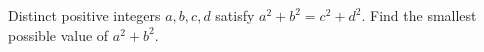 Distinct positive integers $a,b,c,d$ satisfy $a^2+b^2=c^2+d^2$. Find the smallest possible value of $a^2+b^2$.
